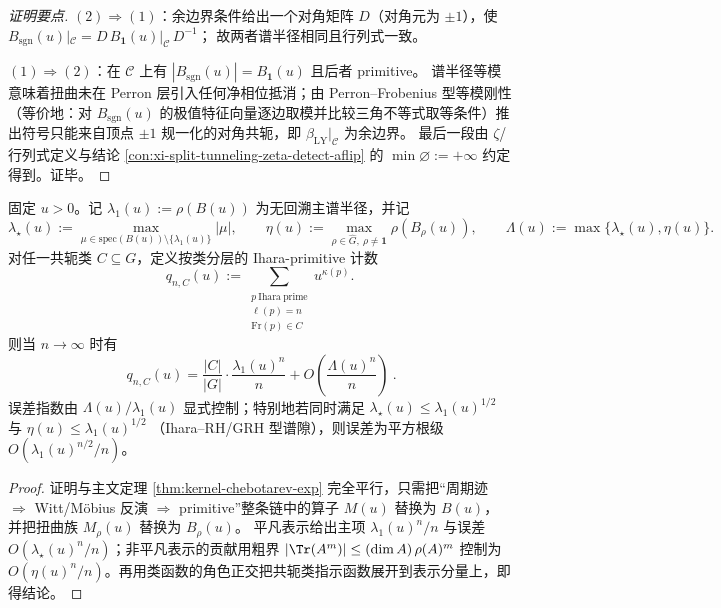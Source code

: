 \begin{proof}[证明要点]
\((2)\Rightarrow(1)\)：余边界条件给出一个对角矩阵 \(D\)（对角元为 \(\pm1\)），使
\(
B_{\mathrm{sgn}}(u)|_{\mathcal C}=D\,B_{\mathbf 1}(u)|_{\mathcal C}\,D^{-1}
\)；
故两者谱半径相同且行列式一致。
\par
\((1)\Rightarrow(2)\)：在 \(\mathcal C\) 上有 \(|B_{\mathrm{sgn}}(u)|=B_{\mathbf 1}(u)\) 且后者 primitive。
谱半径等模意味着扭曲未在 Perron 层引入任何净相位抵消；由 Perron--Frobenius 型等模刚性（等价地：对 \(B_{\mathrm{sgn}}(u)\) 的极值特征向量逐边取模并比较三角不等式取等条件）推出符号只能来自顶点 \(\pm1\) 规一化的对角共轭，即 \(\beta_{\mathrm{LY}}|_{\mathcal C}\) 为余边界。
最后一段由 \(\zeta\)/行列式定义与结论 \ref{con:xi-split-tunneling-zeta-detect-aflip} 的 \(\min\varnothing:=+\infty\) 约定得到。证毕。
\end{proof}

\begin{theorem}\label{thm:ihara-chebotarev-exp}
固定 \(u>0\)。记 \(\lambda_1(u):=\rho(B(u))\) 为无回溯主谱半径，并记
\[
\lambda_\star(u):=\max_{\mu\in\mathrm{spec}(B(u))\setminus\{\lambda_1(u)\}}|\mu|,
\qquad
\eta(u):=\max_{\rho\in\widehat G,\ \rho\neq\mathbf 1}\rho(B_\rho(u)),
\qquad
\Lambda(u):=\max\{\lambda_\star(u),\eta(u)\}.
\]
对任一共轭类 \(C\subseteq G\)，定义按类分层的 Ihara-primitive 计数
\[
q_{n,C}(u):=\sum_{\substack{p\ \mathrm{Ihara\ prime}\\ \ell(p)=n\\ \mathrm{Fr}(p)\in C}}u^{\kappa(p)}.
\]
则当 \(n\to\infty\) 时有
\[
\boxed{\ 
q_{n,C}(u)=\frac{|C|}{|G|}\cdot\frac{\lambda_1(u)^n}{n}
+O\!\left(\frac{\Lambda(u)^n}{n}\right)\ }.
\]
误差指数由 \(\Lambda(u)/\lambda_1(u)\) 显式控制；特别地若同时满足
\(
\lambda_\star(u)\le \lambda_1(u)^{1/2}
\)
与
\(
\eta(u)\le \lambda_1(u)^{1/2}
\)
（Ihara--RH/GRH 型谱隙），则误差为平方根级
\(
O(\lambda_1(u)^{n/2}/n)
\)。
\end{theorem}

\begin{proof}
证明与主文定理 \ref{thm:kernel-chebotarev-exp} 完全平行，只需把“周期迹 \(\Rightarrow\) Witt/Möbius 反演 \(\Rightarrow\) primitive”整条链中的算子 \(M(u)\) 替换为 \(B(u)\)，并把扭曲族 \(M_\rho(u)\) 替换为 \(B_\rho(u)\)。
平凡表示给出主项 \(\lambda_1(u)^n/n\) 与误差 \(O(\lambda_\star(u)^n/n)\)；非平凡表示的贡献用粗界
\(
|\Tr(A^m)|\le (\dim A)\,\rho(A)^m
\)
控制为 \(O(\eta(u)^n/n)\)。再用类函数的角色正交把共轭类指示函数展开到表示分量上，即得结论。
\end{proof}

